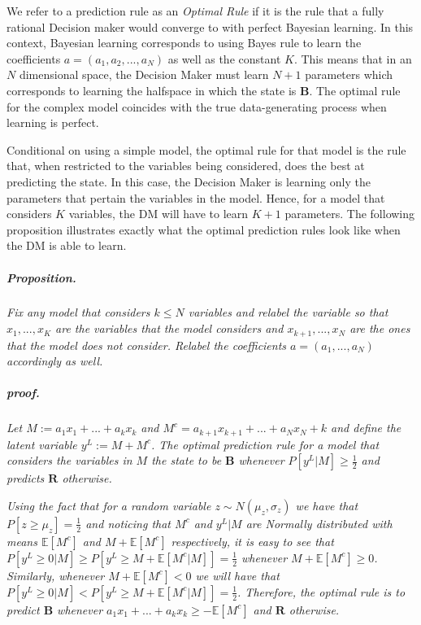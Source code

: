 \documentclass[
  12pt,
]{article}
\begin{document}
We refer to a prediction rule as an \emph{Optimal Rule} if it is the
rule that a fully rational Decision maker would converge to with perfect
Bayesian learning. In this context, Bayesian learning corresponds to
using Bayes rule to learn the coefficients \(a = (a_1, a_2, ..., a_N)\)
as well as the constant \(K\). This means that in an \(N\) dimensional
space, the Decision Maker must learn \(N+1\) parameters which
corresponds to learning the halfspace in which the state is \textbf{B}.
The optimal rule for the complex model coincides with the true
data-generating process when learning is perfect.

Conditional on using a simple model, the optimal rule for that model is
the rule that, when restricted to the variables being considered, does
the best at predicting the state. In this case, the Decision Maker is
learning only the parameters that pertain the variables in the model.
Hence, for a model that considers \(K\) variables, the DM will have to
learn \(K+1\) parameters. The following proposition illustrates exactly
what the optimal prediction rules look like when the DM is able to
learn.

\hypertarget{proposition.}{%
\subparagraph{Proposition.}\label{proposition.}}

\emph{Fix any model that considers \(k\leq N\) variables and relabel the
variable so that \(x_1, ..., x_K\) are the variables that the model
considers and \(x_{k+1}, ..., x_N\) are the ones that the model does not
consider. Relabel the coefficients \(a = (a_1, ..., a_N)\) accordingly
as well.}

\hypertarget{proof.}{%
\subparagraph{proof.}\label{proof.}}

\emph{Let \(M:=a_1x_1+...+a_kx_k\) and
\(M^c = a_{k+1}x_{k+1}+...+a_Nx_N+k\) and define the latent variable
\(y^L := M + M^c\). The optimal prediction rule for a model that
considers the variables in \(M\) the state to be \(\textbf{B}\) whenever
\(P[y^L|M]\geq \frac{1}{2}\) and predicts \(\textbf{R}\) otherwise.}

\emph{Using the fact that for a random variable
\(z\sim N(\mu_z, \sigma_z)\) we have that \(P[z\geq \mu_z]=\frac{1}{2}\)
and noticing that \(M^c\) and \(y^L|M\) are Normally distributed with
means \(\mathbb{E}[M^c]\) and \(M+\mathbb{E}[M^c]\) respectively, it is
easy to see that
\(P[y^L\geq 0 | M] \geq P[y^L\geq M+\mathbb{E}[M^c | M]]=\frac{1}{2}\)
whenever \(M+\mathbb{E}[M^c]\geq 0\). Similarly, whenever
\(M+\mathbb{E}[M^c]< 0\) we will have that
\(P[y^L\geq 0 | M] < P[y^L\geq M+\mathbb{E}[M^c | M]]=\frac{1}{2}\).
Therefore, the optimal rule is to predict \(\mathbf{B}\) whenever
\(a_1x_1+...+a_kx_k\geq -\mathbb{E}[M^c]\) and \(\textbf{R}\)
otherwise.}
\end{document}
